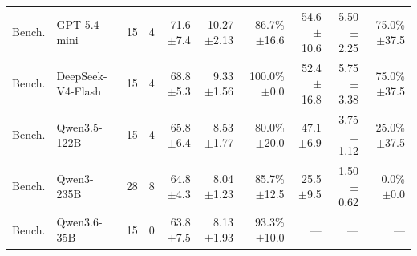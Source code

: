 \begin{table}[t]
{\begin{tabular}{llrrrrrrrr}
Bench. & GPT-5.4-mini & 15 & 4 & \shortstack[r]{71.6\\{\scriptsize $\pm$7.4}} & \shortstack[r]{10.27\\{\scriptsize $\pm$2.13}} & \shortstack[r]{86.7\%\\{\scriptsize $\pm$16.6}} & \shortstack[r]{54.6\\{\scriptsize $\pm$10.6}} & \shortstack[r]{5.50\\{\scriptsize $\pm$2.25}} & \shortstack[r]{75.0\%\\{\scriptsize $\pm$37.5}} \\
Bench. & DeepSeek-V4-Flash & 15 & 4 & \shortstack[r]{68.8\\{\scriptsize $\pm$5.3}} & \shortstack[r]{9.33\\{\scriptsize $\pm$1.56}} & \shortstack[r]{100.0\%\\{\scriptsize $\pm$0.0}} & \shortstack[r]{52.4\\{\scriptsize $\pm$16.8}} & \shortstack[r]{5.75\\{\scriptsize $\pm$3.38}} & \shortstack[r]{75.0\%\\{\scriptsize $\pm$37.5}} \\
Bench. & Qwen3.5-122B & 15 & 4 & \shortstack[r]{65.8\\{\scriptsize $\pm$6.4}} & \shortstack[r]{8.53\\{\scriptsize $\pm$1.77}} & \shortstack[r]{80.0\%\\{\scriptsize $\pm$20.0}} & \shortstack[r]{47.1\\{\scriptsize $\pm$6.9}} & \shortstack[r]{3.75\\{\scriptsize $\pm$1.12}} & \shortstack[r]{25.0\%\\{\scriptsize $\pm$37.5}} \\
Bench. & Qwen3-235B & 28 & 8 & \shortstack[r]{64.8\\{\scriptsize $\pm$4.3}} & \shortstack[r]{8.04\\{\scriptsize $\pm$1.23}} & \shortstack[r]{85.7\%\\{\scriptsize $\pm$12.5}} & \shortstack[r]{25.5\\{\scriptsize $\pm$9.5}} & \shortstack[r]{1.50\\{\scriptsize $\pm$0.62}} & \shortstack[r]{0.0\%\\{\scriptsize $\pm$0.0}} \\
Bench. & Qwen3.6-35B & 15 & 0 & \shortstack[r]{63.8\\{\scriptsize $\pm$7.5}} & \shortstack[r]{8.13\\{\scriptsize $\pm$1.93}} & \shortstack[r]{93.3\%\\{\scriptsize $\pm$10.0}} & --- & --- & --- \\

\end{tabular}}
\end{table}
